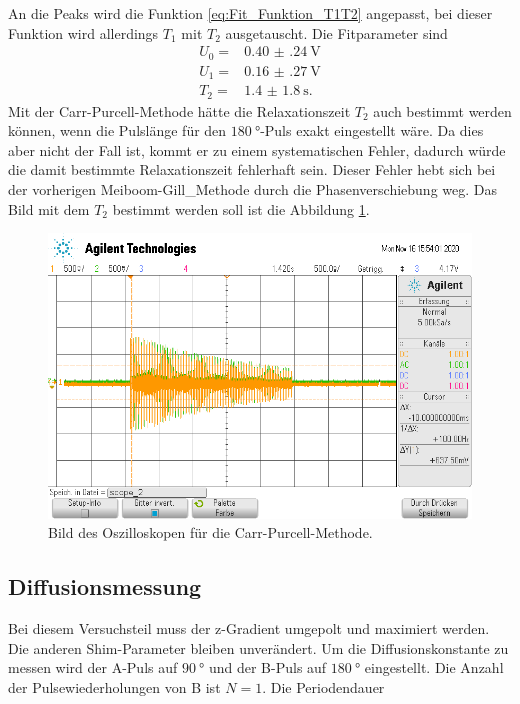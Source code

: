 An die Peaks wird die Funktion \eqref{eq:Fit_Funktion_T1T2} angepasst, bei dieser Funktion wird allerdings $T_{\text{1}}$
mit $T_{\text{2}}$ ausgetauscht.
Die Fitparameter sind
\begin{align*}
  U_{\text{0}} =& \SI{0.40(24)}{\volt}\\
  U_{\text{1}} =& \SI{0.16(27)}{\volt}\\
  T_{\text{2}} =& \SI{1.4(18)}{\second}.
\end{align*}
\FloatBarrier
Mit der Carr-Purcell-Methode hätte die Relaxationszeit $T_{\text{2}}$ auch bestimmt werden können, wenn die Pulslänge 
für den $\SI{180}{\degree}$-Puls exakt eingestellt wäre. Da dies aber nicht der Fall ist, kommt er zu einem systematischen
Fehler, dadurch würde die damit bestimmte Relaxationszeit fehlerhaft sein.
Dieser Fehler hebt sich bei der vorherigen Meiboom-Gill_Methode durch die Phasenverschiebung weg.
Das Bild mit dem $T_{\text{2}}$ bestimmt werden 
soll ist die Abbildung \ref{fig:CPM}. 
\begin{figure}
  \centering
  \includegraphics[width = \textwidth,keepaspectratio]{../Bilder/scope_2.png}
  \caption{Bild des Oszilloskopen für die Carr-Purcell-Methode.}
  \label{fig:CPM}
\end{figure}
\FloatBarrier
\subsection{Diffusionsmessung}
Bei diesem Versuchsteil muss der z-Gradient umgepolt und maximiert werden. Die anderen Shim-Parameter bleiben unverändert. 
Um die Diffusionskonstante zu messen wird der A-Puls auf $\SI{90}{\degree}$ und der B-Puls auf $\SI{180}{\degree}$ eingestellt.
Die Anzahl der Pulsewiederholungen von B ist $N=1$. Die Periodendauer
